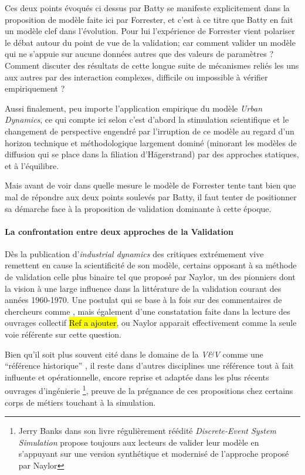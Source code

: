 Ces deux points évoqués ci dessus par Batty se manifeste explicitement dans la proposition de modèle faite ici par Forrester, et c'est à ce titre que Batty en fait un modèle clef dans l'évolution. \autocite{Batty2001} Pour lui l'expérience de Forrester vient polariser le débat autour du point de vue de la validation; car comment valider un modèle qui ne s'appuie sur aucune données autres que des valeurs de paramètres ? Comment discuter des résultats de cette longue suite de mécanismes reliés les uns aux autres par des interaction complexes, difficile ou impossible à vérifier empiriquement ?

Aussi finalement, peu importe l'application empirique du modèle \textit{Urban Dynamics}, ce qui compte ici selon \textcite{Batty1971, Batty1976, Batty2001, Batty2008} c'est d'abord la stimulation scientifique et le changement de perspective engendré par l'irruption de ce modèle au regard d'un horizon technique et méthodologique largement dominé (minorant les modèles de diffusion qui se place dans la filiation d'Hägerstrand) par des approches statiques, et à l'équilibre. 

Mais avant de voir dans quelle mesure le modèle de Forrester tente tant bien que mal de répondre aux deux points soulevés par Batty, il faut tenter de positionner sa démarche face à la proposition de validation dominante à cette époque.

\paragraph{La confrontation entre deux approches de la Validation}
\label{p:confrontation_approches}

Dès la publication d'\textit{industrial dynamics} des critiques extrémement vive remettent en cause la scientificité de son modèle, certains opposant à sa méthode de validation celle plus binaire tel que proposé par Naylor, un des pionniers dont la vision à une large influence dans la littérature de la validation courant des années 1960-1970. Une postulat qui se base à la fois sur des commentaires de chercheurs comme \autocite[1088]{Kleindorfer1998} \autocite{Nance2002}, mais également d'une constatation faite dans la lecture des ouvrages collectif \hl{Ref a ajouter}, ou Naylor apparait effectivement comme la seule voie référente sur cette question. 

Bien qu'il soit plus souvent cité dans le domaine de la \textit{V\&V} comme une \enquote{référence historique} \autocite{Sargent2010}, il reste dans d'autres disciplines une référence tout à fait influente et opérationnelle, encore reprise et adaptée dans les plus récents ouvrages d’ingénierie \footnote{Jerry Banks dans son livre régulièrement réédité \textit{Discrete-Event System Simulation} propose toujours aux lecteurs de valider leur modèle en s'appuyant sur une version synthétique et modernisé de l'approche proposé par Naylor}, preuve de la prégnance de ces propositions chez certains corps de métiers touchant à la simulation.

